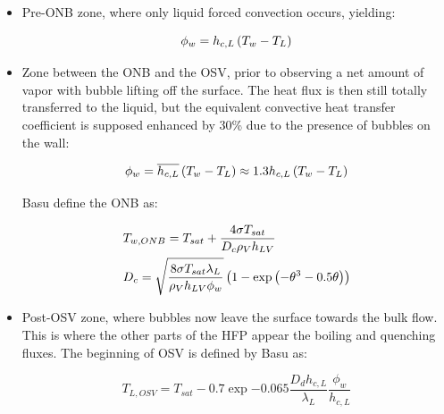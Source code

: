 \begin{itemize}
\item Pre-ONB zone, where only liquid forced convection occurs, yielding:

\begin{equation}
\phi_{w}=h_{c,L} \left( T_{w}-T_{L} \right)
\label{eq:HFP_B_preONB}
\end{equation}

\item Zone between the ONB and the OSV, prior to observing a net amount of vapor with bubble lifting off the surface. The heat flux is then still totally transferred to the liquid, but the equivalent convective heat transfer coefficient is supposed enhanced by 30\% due to the presence of bubbles on the wall:

\begin{equation}
\phi_{w}=\overline{h_{c,L}} \left( T_{w}-T_{L} \right)\approx 1.3 h_{c,L}\left( T_{w}-T_{L} \right)
\label{eq:HFP_B_postONB}
\end{equation}

Basu \etal define the ONB as:

\begin{align}
&T_{w, ONB}= T_{sat} + \frac{4 \sigma T_{sat}}{D_{c}\rho_{V} h_{LV}}\\
%
&D_{c}= \sqrt{\frac{8 \sigma T_{sat} \lambda_{L}}{\rho_{V} h_{LV} \phi_{w}}}\parth{ 1- \exp{ - \theta^{3} - 0.5 \theta}  }
\label{eq:HFP_B_ONB}
\end{align}

\item Post-OSV zone, where bubbles now leave the surface towards the bulk flow. This is where the other parts of the HFP appear \ie the boiling and quenching fluxes. The beginning of OSV is defined by Basu \etal as:

\begin{equation}
T_{L,OSV}=T_{sat}-0.7\exp{-0.065 \frac{D_{d}h_{c,L}}{\lambda_{L}}}\frac{\phi_{w}}{h_{c,L}}
\end{equation}

\end{itemize}


